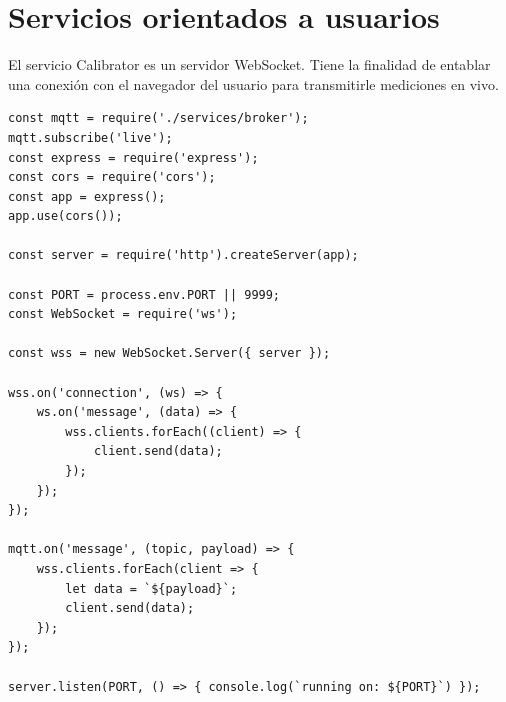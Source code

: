 \section{Servicios orientados a usuarios}

El servicio Calibrator es un servidor WebSocket.
Tiene la finalidad de entablar una conexión con el navegador del usuario para transmitirle mediciones en vivo.

\begin{lstlisting}[label=cod:Calibrator,caption=Archivo principal del servicio Calibrator]
const mqtt = require('./services/broker');
mqtt.subscribe('live');
const express = require('express');
const cors = require('cors');
const app = express();
app.use(cors());

const server = require('http').createServer(app);

const PORT = process.env.PORT || 9999;
const WebSocket = require('ws');

const wss = new WebSocket.Server({ server });

wss.on('connection', (ws) => {
    ws.on('message', (data) => {
        wss.clients.forEach((client) => {
            client.send(data);
        });
    });
});

mqtt.on('message', (topic, payload) => {
    wss.clients.forEach(client => {
        let data = `${payload}`;
        client.send(data);
    });
});

server.listen(PORT, () => { console.log(`running on: ${PORT}`) }); 
\end{lstlisting}



